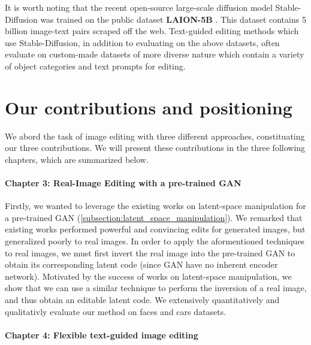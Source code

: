 It is worth noting that the recent open-source large-scale diffusion model Stable-Diffusion was trained 
on the public dataset \textbf{LAION-5B} \citep{schuhmann2022laion}. This dataset contains 
5 billion image-text pairs scraped off the web. Text-guided editing methods which use Stable-Diffusion, 
in addition to evaluating on the above datasets, often evaluate on custom-made datasets \citep{bar2022text2live, mokady2023null} of more diverse nature which contain a variety of object categories and 
text prompts for editing.


\section{Our contributions and positioning}

We abord the task of image editing with three different approaches, constituating our three 
contributions. We will present these contributions in the three following chapters, which 
are summarized below.

\paragraph{Chapter 3: Real-Image Editing with a pre-trained \ac{GAN}}

Firstly, we wanted to leverage the existing works on latent-space manipulation for a pre-trained \ac{GAN} 
(\ref{subsection:latent_space_manipulation}). We remarked that existing works performed powerful and 
convincing edits for generated images, but generalized poorly to real images. In order to apply the 
aformentioned techniques to real images, we must first invert the real image into the pre-trained \ac{GAN}
to obtain its corresponding latent code (since \ac{GAN} have no inherent encoder network). Motivated by 
the success of works on latent-space manipulation, we show that we can use a similar technique to 
perform the inversion of a real image, and thus obtain an editable latent code. We extensively 
quantitatively and qualitativly evaluate our method on faces and cars datasets.

\paragraph{Chapter 4: Flexible text-guided image editing}

